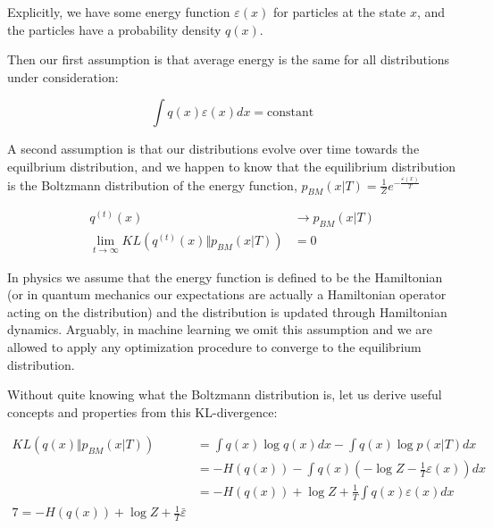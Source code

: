 \documentclass[a4paper]{article}
\begin{document}
Explicitly, we have some energy function $\varepsilon(x)$ for particles at the state $x$, and the particles have a probability density $q(x)$.

Then our first assumption is that average energy is the same for all distributions under consideration:

\begin{equation}
  \int q(x) \varepsilon(x) dx = \text{constant}
  \label{energy conservation}
\end{equation}

A second assumption is that our distributions evolve over time towards the equilbrium distribution, and we happen to know that the equilibrium distribution is the Boltzmann distribution of the energy function, $p_{BM}(x \vert T) = \frac{1}{Z} e^{ - \frac{\varepsilon(x)}{T} } $

\begin{equation}
  \begin{split}
    q^{(t)}(x) &\rightarrow p_{BM}( x \vert T ) \\
    \lim_{t \rightarrow \infty} KL \left( q^{(t)}(x) \Vert p_{BM}( x \vert T ) \right) &= 0
  \end{split}
  \label{equilibrium}
\end{equation}

In physics we assume that the energy function is defined to be the Hamiltonian (or in quantum mechanics our expectations are actually a Hamiltonian operator acting on the distribution) and the distribution is updated through Hamiltonian dynamics.  Arguably, in machine learning we omit this assumption and we are allowed to apply any optimization procedure to converge to the equilibrium distribution.

Without quite knowing what the Boltzmann distribution is, let us derive useful concepts and properties from this KL-divergence:

\begin{equation}
  \begin{split}
    KL \left( q(x) \Vert p_{BM}( x \vert T ) \right) &= \int q(x) \log q(x) dx - \int q(x) \log p( x \vert T ) dx \\
    &= -H\left( q(x) \right) - \int q(x) \left( - \log Z - \frac{1}{T} \varepsilon(x) \right) dx \\
    &= -H \left( q(x) \right) + \log Z + \frac{1}{T} \int q(x) \varepsilon(x) dx \\
    7= -H \left( q(x) \right) + \log Z + \frac{1}{T} \bar{\varepsilon}
  \end{split}
  \label{}
\end{equation}
\end{document}
